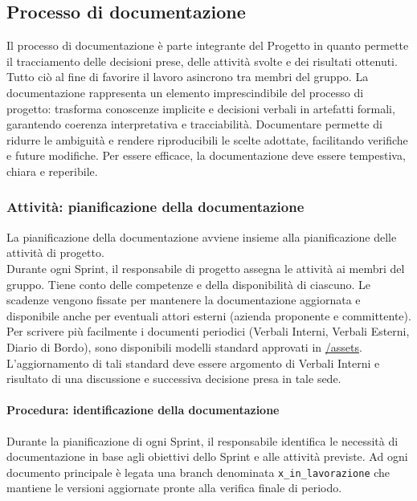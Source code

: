 \documentclass[a4paper,12pt]{article}
\begin{document}
\subsection{Processo di documentazione} \label{documentazione}
Il processo di documentazione è parte integrante del Progetto in quanto
permette il tracciamento delle decisioni prese, delle attività svolte e dei
risultati ottenuti. Tutto ciò al fine di favorire il lavoro asincrono tra
membri del gruppo. La documentazione rappresenta un elemento imprescindibile
del processo di progetto: trasforma conoscenze implicite e decisioni verbali in
artefatti formali, garantendo coerenza interpretativa e tracciabilità.
Documentare permette di ridurre le ambiguità e rendere riproducibili le scelte
adottate, facilitando verifiche e future modifiche. Per essere efficace, la
documentazione deve essere tempestiva, chiara e reperibile.

\subsubsection{Attività: pianificazione della documentazione} \label{pianificazioneDocs}
La pianificazione della documentazione avviene insieme alla pianificazione
delle attività di progetto. \\Durante ogni Sprint, il responsabile di progetto
assegna le attività ai membri del gruppo. Tiene conto delle competenze e della
disponibilità di ciascuno. Le scadenze vengono fissate per mantenere la
documentazione aggiornata e disponibile anche per eventuali attori esterni
(azienda proponente e committente). \\Per scrivere più facilmente i documenti
periodici (Verbali Interni, Verbali Esterni, Diario di Bordo), sono disponibili
modelli standard approvati in
\href{https://github.com/7-ZPUs/Docs/tree/main/assets}{/assets}.
L'aggiornamento di tali standard deve essere argomento di Verbali Interni e
risultato di una discussione e successiva decisione presa in tale sede.

\paragraph{Procedura: identificazione della documentazione}\label{procedurePianificaDocs}
Durante la pianificazione di ogni Sprint, il responsabile identifica le
necessità di documentazione in base agli obiettivi dello Sprint e alle attività
previste. Ad ogni documento principale è legata una branch denominata
\texttt{x\_in\_lavorazione} che mantiene le versioni aggiornate pronte alla
verifica finale di periodo.
\end{document}
